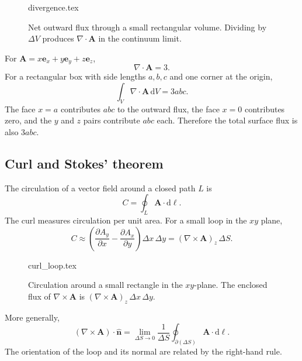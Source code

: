 \begin{figure}[htb]
    \centering
    {divergence.tex}
    \caption{Net outward flux through a small rectangular volume. Dividing by $\Delta V$ produces $\nabla\cdot\mathbf{A}$ in the continuum limit.}
    \label{fig:vec-divergence}
\end{figure}

\begin{example}
For $\mathbf{A}=x\mathbf{e}_x+y\mathbf{e}_y+z\mathbf{e}_z$,
\begin{equation}
\nabla\cdot\mathbf{A}=3.
\end{equation}
For a rectangular box with side lengths $a,b,c$ and one corner at the origin,
\begin{equation}
\int_V\nabla\cdot\mathbf{A}\,\mathrm{d}V=3abc.
\end{equation}
The face $x=a$ contributes $abc$ to the outward flux, the face $x=0$ contributes zero, and the $y$ and $z$ pairs contribute $abc$ each. Therefore the total surface flux is also $3abc$.
\end{example}

\subsection{Curl and Stokes' theorem}
The circulation of a vector field around a closed path $L$ is
\begin{equation}
C=\oint_L\mathbf{A}\cdot\mathrm{d}\boldsymbol{\ell}.
\end{equation}
The curl measures circulation per unit area. For a small loop in the $xy$ plane,
\begin{equation}
C\approx\left(\frac{\partial A_y}{\partial x}
-\frac{\partial A_x}{\partial y}\right)\Delta x\,\Delta y
=(\nabla\times\mathbf{A})_z\,\Delta S.
\end{equation}

\begin{figure}[H]
    \centering
    {curl_loop.tex}
    \caption{Circulation around a small rectangle in the $xy$-plane. The enclosed flux of $\nabla\times\mathbf{A}$ is $(\nabla\times\mathbf{A})_z\,\Delta x\,\Delta y$.}
    \label{fig:vec-curl}
\end{figure}
More generally,
\begin{equation}
(\nabla\times\mathbf{A})\cdot\hat{\mathbf{n}}
=\lim_{\Delta S\to0}\frac{1}{\Delta S}
\oint_{\partial(\Delta S)}\mathbf{A}\cdot\mathrm{d}\boldsymbol{\ell}.
\end{equation}
The orientation of the loop and its normal are related by the right-hand rule.

